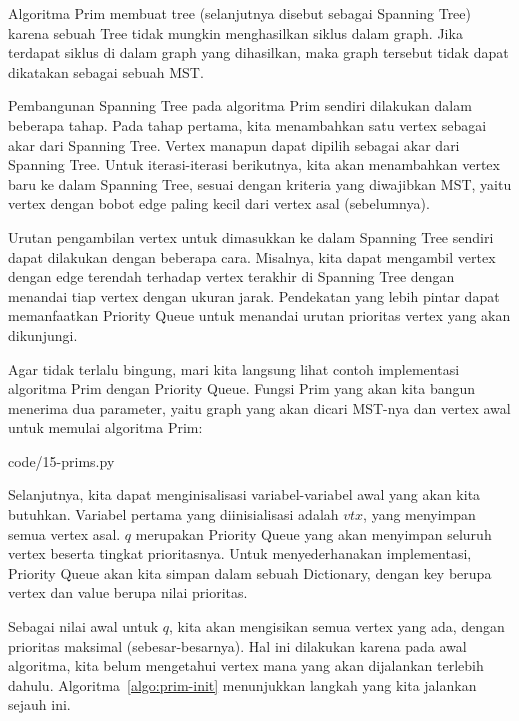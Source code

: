 Algoritma Prim membuat tree (selanjutnya disebut sebagai Spanning Tree) karena sebuah Tree tidak mungkin menghasilkan siklus dalam graph. Jika terdapat siklus di dalam graph yang dihasilkan, maka graph tersebut tidak dapat dikatakan sebagai sebuah MST.

Pembangunan Spanning Tree pada algoritma Prim sendiri dilakukan dalam beberapa tahap. Pada tahap pertama, kita menambahkan satu vertex sebagai akar dari Spanning Tree. Vertex manapun dapat dipilih sebagai akar dari Spanning Tree. Untuk iterasi-iterasi berikutnya, kita akan menambahkan vertex baru ke dalam Spanning Tree, sesuai dengan kriteria yang diwajibkan MST, yaitu vertex dengan bobot edge paling kecil dari vertex asal (sebelumnya).

Urutan pengambilan vertex untuk dimasukkan ke dalam Spanning Tree sendiri dapat dilakukan dengan beberapa cara. Misalnya, kita dapat mengambil vertex dengan edge terendah terhadap vertex terakhir di Spanning Tree dengan menandai tiap vertex dengan ukuran jarak. Pendekatan yang lebih pintar dapat memanfaatkan Priority Queue untuk menandai urutan prioritas vertex yang akan dikunjungi.

Agar tidak terlalu bingung, mari kita langsung lihat contoh implementasi algoritma Prim dengan Priority Queue. Fungsi Prim yang akan kita bangun menerima dua parameter, yaitu graph yang akan dicari MST-nya dan vertex awal untuk memulai algoritma Prim:


                {code/15-prims.py}

Selanjutnya, kita dapat menginisalisasi variabel-variabel awal yang akan kita butuhkan. Variabel pertama yang diinisialisasi adalah $vtx$, yang menyimpan semua vertex asal. $q$ merupakan Priority Queue yang akan menyimpan seluruh vertex beserta tingkat prioritasnya. Untuk menyederhanakan implementasi, Priority Queue akan kita simpan dalam sebuah Dictionary, dengan key berupa vertex dan value berupa nilai prioritas.

Sebagai nilai awal untuk $q$, kita akan mengisikan semua vertex yang ada, dengan prioritas maksimal (sebesar-besarnya). Hal ini dilakukan karena pada awal algoritma, kita belum mengetahui vertex mana yang akan dijalankan terlebih dahulu. Algoritma~\ref{algo:prim-init} menunjukkan langkah yang kita jalankan sejauh ini.

